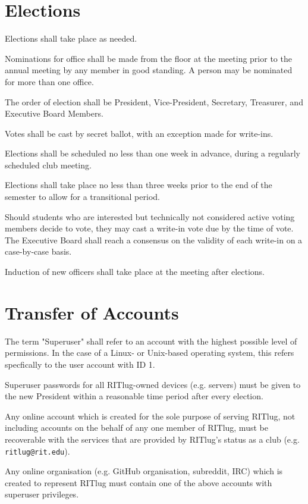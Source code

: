 \section{Elections}
\begin{subroutines}
\item Elections shall take place as needed.
\item Nominations for office shall be made from the floor at the meeting prior to the annual meeting by any member in good standing. A person may be nominated for more than one office.
\item The order of election shall be President, Vice-President, Secretary, Treasurer, and Executive Board Members.
\item Votes shall be cast by secret ballot, with an exception made for write-ins.
\item Elections shall be scheduled no less than one week in advance, during a regularly scheduled club meeting.
\item Elections shall take place no less than three weeks prior to the end of the semester to allow for a transitional period.
\item Should students who are interested but technically not considered active voting members decide to vote, they may cast a write-in vote due by the time of vote. The Executive Board shall reach a consensus on the validity of each write-in on a case-by-case basis.
\item Induction of new officers shall take place at the meeting after elections.
\end{subroutines}

\section{Transfer of Accounts}
\begin{subroutines}
\item The term "Superuser" shall refer to an account with the highest possible level of permissions. In the case of a Linux- or Unix-based operating system, this refers specfically to the user account with ID 1.
\item Superuser passwords for all RITlug-owned devices (e.g. servers) must be given to the new President within a reasonable time period after every election.
\item Any online account which is created for the sole purpose of serving RITlug, not including accounts on the behalf of any one member of RITlug, must be recoverable with the services that are provided by RITlug's status as a club (e.g. \texttt{ritlug@rit.edu}).
\item Any online organisation (e.g. GitHub organisation, subreddit, IRC) which is created to represent RITlug must contain one of the above accounts with superuser privileges.
\end{subroutines}

